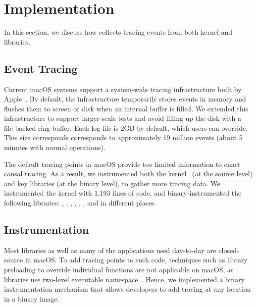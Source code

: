\section{Implementation}\label{sec:implementation}

In this section, we discuss how \xxx collects tracing events from both kernel
and libraries.

\subsection{Event Tracing}

Current macOS systems support a system-wide tracing infrastructure built by
Apple~\cite{linktotracetool}. By default, the infrastructure temporarily stores
events in memory and flushes them to screen or disk when an internal buffer
is filled. We extended this infrastructure to support larger-scale tests and
avoid filling up the disk with a file-backed ring buffer. Each log file is 2GB
by default, which users can override. This size corresponds corresponds to
approximately 19 million events (about 5 minutes with normal operations).

The default tracing points in macOS provide too limited information
to enact causal tracing. As a result, we instrumented both the
kernel~\cite{linkofxnusourcecode} (at the source level) and key libraries
(at the binary level), to gather more tracing data. We instrumented the kernel
with 1,193 lines of code, and binary-instrumented the following libraries:
, , ,
, , ,  and
 in \nlibchanges different places.



\subsection{Instrumentation}

Most libraries as well as many of the applications used day-to-day are
closed-source in macOS. To add tracing points to such code, techniques such as
library preloading to override individual functions are not applicable on macOS,
as libraries use two-level executable namespace~\cite{twolayernamespace}. Hence,
we implemented a binary instrumentation mechanism that allows developers to add
tracing at any location in a binary image.

